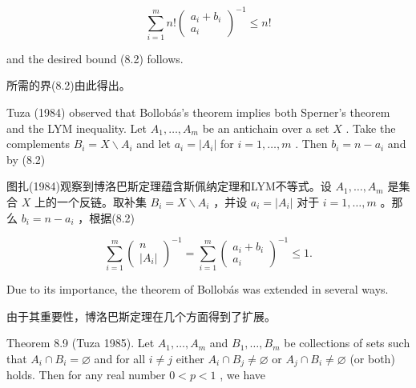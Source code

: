 \documentclass[10pt]{article}
\begin{document}
\[
\mathop{\sum }\limits_{{i = 1}}^{m}n!{\left( \begin{matrix} {a}_{i} + {b}_{i} \\  {a}_{i} \end{matrix}\right) }^{-1} \leq  n!
\]

and the desired bound (8.2) follows.

\begin{tcolorbox}\relax
所需的界(8.2)由此得出。
\end{tcolorbox}

Tuza (1984) observed that Bollobás's theorem implies both Sperner's theorem and the LYM inequality. Let \({A}_{1},\ldots ,{A}_{m}\) be an antichain over a set \(X\) . Take the complements \({B}_{i} = X \smallsetminus  {A}_{i}\) and let \({a}_{i} = \left| {A}_{i}\right|\) for \(i = 1,\ldots ,m\) . Then \({b}_{i} = n - {a}_{i}\) and by (8.2)

\begin{tcolorbox}\relax
图扎(1984)观察到博洛巴斯定理蕴含斯佩纳定理和LYM不等式。设 \({A}_{1},\ldots ,{A}_{m}\) 是集合 \(X\) 上的一个反链。取补集 \({B}_{i} = X \smallsetminus  {A}_{i}\) ，并设 \({a}_{i} = \left| {A}_{i}\right|\) 对于 \(i = 1,\ldots ,m\) 。那么 \({b}_{i} = n - {a}_{i}\) ，根据(8.2)
\end{tcolorbox}

\[
\mathop{\sum }\limits_{{i = 1}}^{m}{\left( \begin{matrix} n \\  \left| {A}_{i}\right|  \end{matrix}\right) }^{-1} = \mathop{\sum }\limits_{{i = 1}}^{m}{\left( \begin{matrix} {a}_{i} + {b}_{i} \\  {a}_{i} \end{matrix}\right) }^{-1} \leq  1.
\]

Due to its importance, the theorem of Bollobás was extended in several ways.

\begin{tcolorbox}\relax
由于其重要性，博洛巴斯定理在几个方面得到了扩展。
\end{tcolorbox}

Theorem 8.9 (Tuza 1985). Let \({A}_{1},\ldots ,{A}_{m}\) and \({B}_{1},\ldots ,{B}_{m}\) be collections of sets such that \({A}_{i} \cap  {B}_{i} = \varnothing\) and for all \(i \neq  j\) either \({A}_{i} \cap  {B}_{j} \neq  \varnothing\) or \({A}_{j} \cap  {B}_{i} \neq  \varnothing\) (or both) holds. Then for any real number \(0 < p < 1\) , we have
\end{document}

